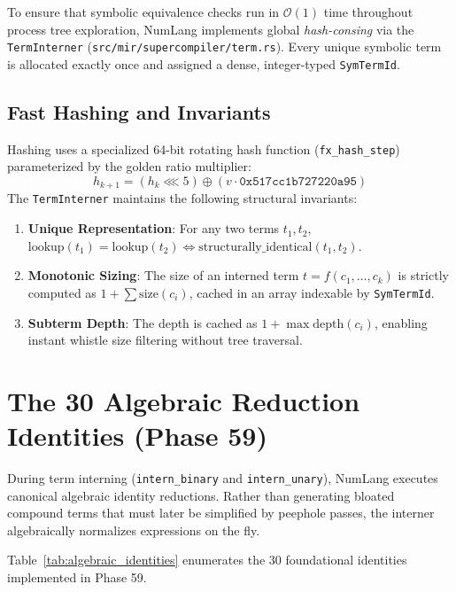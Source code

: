 To ensure that symbolic equivalence checks run in $\mathcal{O}(1)$ time throughout process tree exploration, NumLang implements global \emph{hash-consing} via the \texttt{TermInterner} (\texttt{src/mir/supercompiler/term.rs}). Every unique symbolic term is allocated exactly once and assigned a dense, integer-typed \texttt{SymTermId}.

\subsection{Fast Hashing and Invariants}
Hashing uses a specialized 64-bit rotating hash function (\texttt{fx\_hash\_step}) parameterized by the golden ratio multiplier:
\begin{equation}
h_{k+1} = (h_k \lll 5) \oplus (v \cdot \mathtt{0x517cc1b727220a95})
\end{equation}
The \texttt{TermInterner} maintains the following structural invariants:
\begin{enumerate}
    \item \textbf{Unique Representation}: For any two terms $t_1, t_2$, $\text{lookup}(t_1) = \text{lookup}(t_2) \iff \text{structurally\_identical}(t_1, t_2)$.
    \item \textbf{Monotonic Sizing}: The size of an interned term $t = f(c_1, \dots, c_k)$ is strictly computed as $1 + \sum \text{size}(c_i)$, cached in an array indexable by \texttt{SymTermId}.
    \item \textbf{Subterm Depth}: The depth is cached as $1 + \max \text{depth}(c_i)$, enabling instant whistle size filtering without tree traversal.
\end{enumerate}

\section{The 30 Algebraic Reduction Identities (Phase 59)}
\label{sec:symbolic_state:identities}

During term interning (\texttt{intern\_binary} and \texttt{intern\_unary}), NumLang executes canonical algebraic identity reductions. Rather than generating bloated compound terms that must later be simplified by peephole passes, the interner algebraically normalizes expressions on the fly. 

Table~\ref{tab:algebraic_identities} enumerates the 30 foundational identities implemented in Phase 59.

